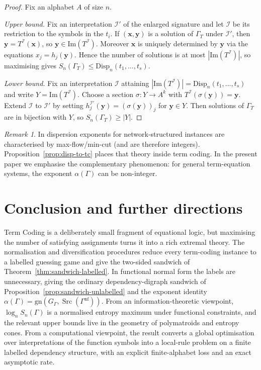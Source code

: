 \documentclass[11pt]{article}
\theoremstyle{plain}
\theoremstyle{definition}
\theoremstyle{definition}
\theoremstyle{remark}
\newtheorem{remark}[theorem]{Remark}
\newcommand{\A}{A}
\newcommand{\Sn}{S_n}
\newcommand{\abs}[1]{\left\lvert #1 \right\rvert}
\newcommand{\gn}{\mathrm{gn}}
\newcommand{\Src}{\operatorname{Src}}
\begin{document}
\begin{proof}
Fix an alphabet $\A$ of size $n$.

\smallskip
\noindent\emph{Upper bound.}
Fix an interpretation $\mathcal I'$ of the enlarged signature and let $\mathcal I$ be its restriction to the
symbols in the $t_i$.
If $(\mathbf x,\mathbf y)$ is a solution of $\Gamma_T$ under $\mathcal I'$, then $\mathbf y=T^{\mathcal I}(\mathbf x)$,
so $\mathbf y\in \mathrm{Im}(T^{\mathcal I})$.
Moreover $\mathbf x$ is uniquely determined by $\mathbf y$ via the equations $x_j=h_j(\mathbf y)$.
Hence the number of solutions is at most $\abs{\mathrm{Im}(T^{\mathcal I})}$, so maximising gives
$\Sn(\Gamma_T)\le \mathrm{Disp}_n(t_1,\dots,t_s)$.

\smallskip
\noindent\emph{Lower bound.}
Fix an interpretation $\mathcal I$ attaining
$\abs{\mathrm{Im}(T^{\mathcal I})}=\mathrm{Disp}_n(t_1,\dots,t_s)$ and write $Y=\mathrm{Im}(T^{\mathcal I})$.
Choose a section $\sigma:Y\to\A^k$ with $T^{\mathcal I}(\sigma(\mathbf y))=\mathbf y$.
Extend $\mathcal I$ to $\mathcal I'$ by setting $h_j^{\mathcal I'}(\mathbf y)=(\sigma(\mathbf y))_j$ for $\mathbf y\in Y$.
Then solutions of $\Gamma_T$ are in bijection with $Y$, so $\Sn(\Gamma_T)\ge \abs{Y}$.
\end{proof}

\begin{remark}
In \cite{riis2019max} dispersion exponents for network-structured instances are characterised by max-flow/min-cut
(and are therefore integers). Proposition~\ref{prop:disp-to-tc} places that theory inside term coding.
In the present paper we emphasise the complementary phenomenon: for general term-equation systems, the exponent
$\alpha(\Gamma)$ can be non-integer.
\end{remark}

\section{Conclusion and further directions}
\label{sec:conclusion}

Term Coding is a deliberately small fragment of equational logic, but maximising the number of satisfying
assignments turns it into a rich extremal theory.
The normalisation and diversification procedures reduce every term-coding instance to a labelled guessing game and
give the two-sided sandwich of Theorem~\ref{thm:sandwich-labelled}.  In functional normal form the labels are
unnecessary, giving the ordinary dependency-digraph sandwich of Proposition~\ref{prop:sandwich-unlabelled} and the
exponent identity $\alpha(\Gamma)=\gn(G_\Gamma,\Src(\Gamma^{\mathrm{nf}}))$.
From an information-theoretic viewpoint, $\log_n \Sn(\Gamma)$ is a normalised entropy maximum under functional
constraints, and the relevant upper bounds live in the geometry of polymatroids and entropy cones.
From a computational viewpoint, the result converts a global optimisation over interpretations
of the function symbols into a local-rule problem on a finite labelled dependency structure,
with an explicit finite-alphabet loss and an exact asymptotic rate.
\end{document}
